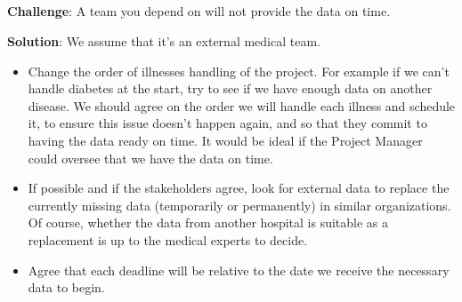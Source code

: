 \subsection*{}
\begin{warning}
    \textbf{Challenge}: A team you depend on will not provide the data on time.

    \textbf{Solution}: We assume that it’s an external medical team.

    \begin{itemize}
        \item Change the order of illnesses handling of the project.
        For example if we can’t handle diabetes at the start, try to see if we have enough data on another disease.
        We should agree on the order we will handle each illness and schedule it, to ensure this issue doesn’t happen again,
        and so that they commit to having the data ready on time.
        It would be ideal if the Project Manager could oversee that we have the data on time.


        \item If possible and if the stakeholders agree, look for external data to replace the currently missing data
        (temporarily or permanently) in similar organizations.
        Of course, whether the data from another hospital is suitable as a replacement is up to the medical experts to decide.


        \item Agree that each deadline will be relative to the date we receive the necessary data to begin.


    \end{itemize}


\end{warning}